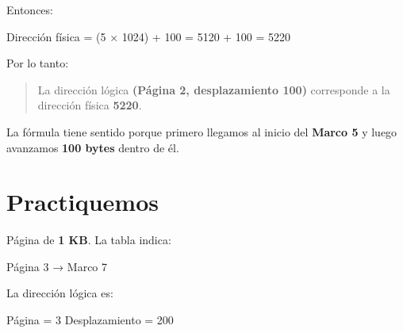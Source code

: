 \documentclass[
  spanish,
  letterpaper,
]{scrbook}
\newenvironment{Shaded}{\begin{snugshade}}{\end{snugshade}}
\newcommand{\NormalTok}[1]{\textcolor[rgb]{0.00,0.23,0.31}{#1}}
\begin{document}
Entonces:

\begin{Shaded}
\begin{Highlighting}[]
\NormalTok{Dirección física = (5 × 1024) + 100}
\NormalTok{                  = 5120 + 100}
\NormalTok{                  = 5220}
\end{Highlighting}
\end{Shaded}

Por lo tanto:

\begin{quote}
La dirección lógica \textbf{(Página 2, desplazamiento 100)} corresponde
a la dirección física \textbf{5220}.
\end{quote}

\begin{tcolorbox}[enhanced jigsaw, arc=.35mm, bottomrule=.15mm, bottomtitle=1mm, breakable, colback=white, colbacktitle=quarto-callout-warning-color!10!white, colframe=quarto-callout-warning-color-frame, coltitle=black, left=2mm, leftrule=.75mm, opacityback=0, opacitybacktitle=0.6, rightrule=.15mm, title=\textcolor{quarto-callout-warning-color}{\faExclamationTriangle}\hspace{0.5em}{No memorices sin comprender}, titlerule=0mm, toprule=.15mm, toptitle=1mm]

La fórmula tiene sentido porque primero llegamos al inicio del
\textbf{Marco 5} y luego avanzamos \textbf{100 bytes} dentro de él.

\end{tcolorbox}

\section{Practiquemos}\label{practiquemos-1}

Página de \textbf{1 KB}. La tabla indica:

\begin{Shaded}
\begin{Highlighting}[]
\NormalTok{Página 3 → Marco 7}
\end{Highlighting}
\end{Shaded}

La dirección lógica es:

\begin{Shaded}
\begin{Highlighting}[]
\NormalTok{Página = 3}
\NormalTok{Desplazamiento = 200}
\end{Highlighting}
\end{Shaded}
\end{document}
